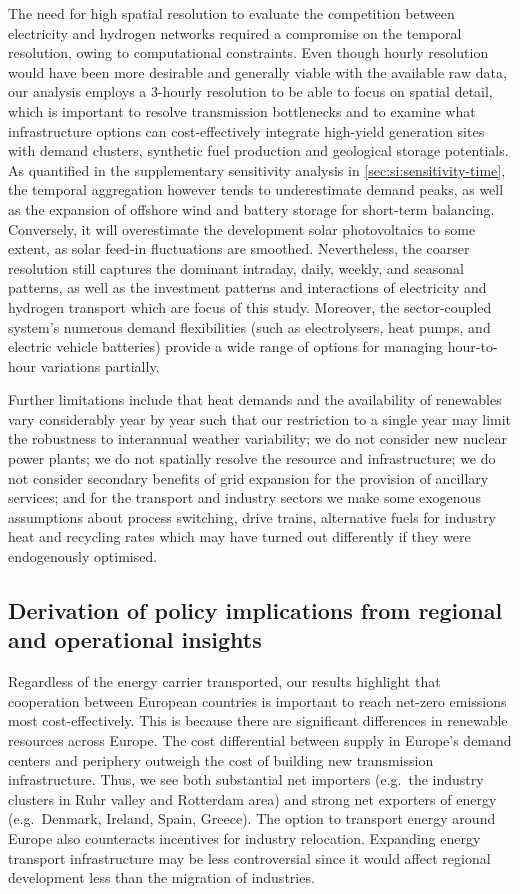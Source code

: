 The need for high spatial resolution to evaluate the competition between
electricity and hydrogen networks required a compromise on the temporal
resolution, owing to computational constraints. Even though hourly resolution
would have been more desirable and generally viable with the available raw data,
our analysis employs a 3-hourly resolution to be able to focus on spatial
detail, which is important to resolve transmission bottlenecks and to examine
what infrastructure options can cost-effectively integrate high-yield generation
sites with demand clusters, synthetic fuel production and geological storage
potentials. As quantified in the supplementary sensitivity analysis in
\cref{sec:si:sensitivity-time}, the temporal aggregation however tends to
underestimate demand peaks, as well as the expansion of offshore wind and
battery storage for short-term balancing. Conversely, it will overestimate the
development solar photovoltaics to some extent, as solar feed-in fluctuations
are smoothed. Nevertheless, the coarser resolution still captures the dominant
intraday, daily, weekly, and seasonal patterns, as well as the investment
patterns and interactions of electricity and hydrogen transport which are focus
of this study. Moreover, the sector-coupled system's numerous demand
flexibilities (such as electrolysers, heat pumps, and electric vehicle
batteries) provide a wide range of options for managing hour-to-hour variations
partially.

Further limitations include that heat demands and the availability of renewables
vary considerably year by year such that our restriction to a single year may
limit the robustness to interannual weather variability; we do not consider new
nuclear power plants; we do not spatially resolve the \co resource and
infrastructure; we do not consider secondary benefits of grid expansion for the
provision of ancillary services; and for the transport and industry sectors we
make some exogenous assumptions about process switching, drive trains,
alternative fuels for industry heat and recycling rates which may have turned
out differently if they were endogenously optimised.

\subsection*{Derivation of policy implications from regional and operational insights}
\label{sec:policy}

Regardless of the energy carrier transported, our results highlight that
cooperation between European countries is important to reach net-zero \co
emissions most cost-effectively. This is because there are significant
differences in renewable resources across Europe. The cost differential between
supply in Europe's demand centers and periphery outweigh the cost of building
new transmission infrastructure. Thus, we see both substantial net importers
(e.g.~the industry clusters in Ruhr valley and Rotterdam area) and strong net
exporters of energy (e.g.~Denmark, Ireland, Spain, Greece). The option to
transport energy around Europe also counteracts incentives for industry
relocation. Expanding energy transport infrastructure may be less controversial
since it would affect regional development less than the migration of
industries.

